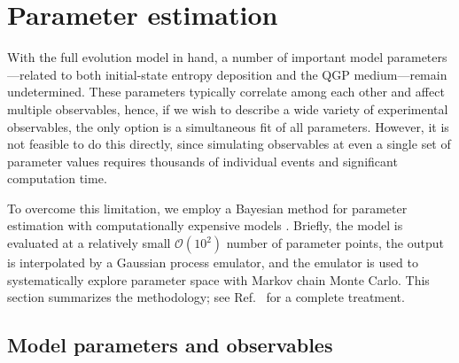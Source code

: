 \documentclass[aps,prc,reprint,amsmath,nofootinbib]{revtex4-1}
\newcommand{\order}[1]{$\mathcal O(10^{#1})$}
\begin{document}
\section{Parameter estimation}

With the full evolution model in hand, a number of important model parameters---related to both initial-state entropy deposition and the QGP medium---remain undetermined.
These parameters typically correlate among each other and affect multiple observables, hence, if we wish to describe a wide variety of experimental observables, the only option is a simultaneous fit of all parameters.
However, it is not feasible to do this directly, since simulating observables at even a single set of parameter values requires thousands of individual events and significant computation time.

To overcome this limitation, we employ a Bayesian method for parameter estimation with computationally expensive models \cite{OHagan:2006ba,Higdon:2008cmc,Higdon:2014tva,Wesolowski:2015fqa}.
Briefly, the model is evaluated at a relatively small \order 2 number of parameter points, the output is interpolated by a Gaussian process emulator, and the emulator is used to systematically explore parameter space with Markov chain Monte Carlo.
This section summarizes the methodology; see Ref.~\cite{Bernhard:2015hxa} for a complete treatment.

\subsection{Model parameters and observables}
\end{document}
